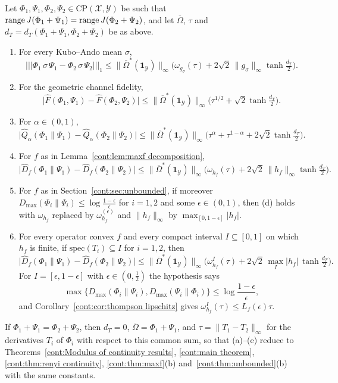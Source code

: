 \begin{theorem}\label{cont:thm:four maps}
Let $\Phi_1,\Psi_1,\Phi_2,\Psi_2\in\mathrm{CP}(\mathcal{X},\mathcal{Y})$ be such that $\operatorname{range} J(\Phi_1+\Psi_1)=\operatorname{range} J(\Phi_2+\Psi_2)$, and let $\overline{\Omega}$, $\tau$ and $d_T=d_T(\Phi_1+\Psi_1,\Phi_2+\Psi_2)$ be as above.
\begin{enumerate}
\item[(a)] For every Kubo--Ando mean $\sigma$,
\[
|||\Phi_1\,\sigma\,\Psi_1-\Phi_2\,\sigma\,\Psi_2|||_1\leq\|\overline{\Omega}^*(\mathbf{1}_{\mathcal{Y}})\|_\infty\Big(\omega_{g_\sigma}(\tau)+2\sqrt2\,\|g_\sigma\|_\infty\tanh\tfrac{d_T}{2}\Big).
\]
\item[(b)] For the geometric channel fidelity,
\[
\big|\widehat{F}(\Phi_1,\Psi_1)-\widehat{F}(\Phi_2,\Psi_2)\big|\leq\|\overline{\Omega}^*(\mathbf{1}_{\mathcal{Y}})\|_\infty\Big(\tau^{1/2}+\sqrt2\tanh\tfrac{d_T}{2}\Big).
\]
\item[(c)] For $\alpha\in(0,1)$,
\[
\big|\widehat{Q}_\alpha(\Phi_1\|\Psi_1)-\widehat{Q}_\alpha(\Phi_2\|\Psi_2)\big|\leq\|\overline{\Omega}^*(\mathbf{1}_{\mathcal{Y}})\|_\infty\Big(\tau^\alpha+\tau^{1-\alpha}+2\sqrt2\tanh\tfrac{d_T}{2}\Big).
\]
\item[(d)] For $f$ as in Lemma~\ref{cont:lem:maxf decomposition},
\[
\big|\widehat{D}_f(\Phi_1\|\Psi_1)-\widehat{D}_f(\Phi_2\|\Psi_2)\big|\leq\|\overline{\Omega}^*(\mathbf{1}_{\mathcal{Y}})\|_\infty\Big(\omega_{h_f}(\tau)+2\sqrt2\,\|h_f\|_\infty\tanh\tfrac{d_T}{2}\Big).
\]
\item[(e)] For $f$ as in Section~\ref{cont:sec:unbounded}, if moreover $D_{\max}(\Phi_i\|\Psi_i)\leq\log\frac{1-\epsilon}{\epsilon}$ for $i=1,2$ and some $\epsilon\in(0,1)$, then (d) holds with $\omega_{h_f}$ replaced by $\omega^{(\epsilon)}_{h_f}$ and $\|h_f\|_\infty$ by $\max_{[0,1-\epsilon]}|h_f|$.
\item[(f)] For every operator convex $f$ and every compact interval $I\subseteq[0,1]$ on which $h_f$ is finite, if $\mathrm{spec}(T_i)\subseteq I$ for $i=1,2$, then
\[
\big|\widehat{D}_f(\Phi_1\|\Psi_1)-\widehat{D}_f(\Phi_2\|\Psi_2)\big|\leq\|\overline{\Omega}^*(\mathbf{1}_{\mathcal{Y}})\|_\infty\Big(\omega^I_{h_f}(\tau)+2\sqrt2\,\max_I|h_f|\,\tanh\tfrac{d_T}{2}\Big).
\]
For $I=[\epsilon,1-\epsilon]$ with $\epsilon\in(0,\frac12)$ the hypothesis says
\[
\max\{D_{\max}(\Phi_i\|\Psi_i),D_{\max}(\Psi_i\|\Phi_i)\}\leq\log\frac{1-\epsilon}{\epsilon},
\]
and Corollary~\ref{cont:cor:thompson lipschitz} gives $\omega^I_{h_f}(\tau)\leq L_f(\epsilon)\tau$.
\end{enumerate}
If $\Phi_1+\Psi_1=\Phi_2+\Psi_2$, then $d_T=0$, $\overline{\Omega}=\Phi_1+\Psi_1$, and $\tau=\|T_1-T_2\|_\infty$ for the derivatives $T_i$ of $\Phi_i$ with respect to this common sum, so that (a)--(e) reduce to Theorems~\ref{cont:Modulus of continuity results}, \ref{cont:main theorem}, \ref{cont:thm:renyi continuity}, \ref{cont:thm:maxf}(b) and~\ref{cont:thm:unbounded}(b) with the same constants.
\end{theorem}

